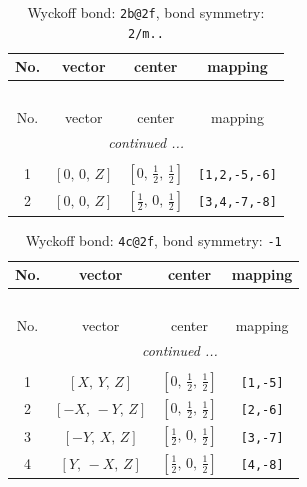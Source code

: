 \documentclass[fleqn,8pt]{jsarticle}
\begin{document}
\renewcommand{\arraystretch}{1.2}
\begin{longtable}{cccc}
\caption{Wyckoff bond: {\tt 2b@2f}, bond symmetry: {\tt 2/m..}}
 \\
 \hline \hline
No. & vector & center & mapping \\ \hline \endfirsthead

\multicolumn{3}{l}{\tablename\ \thetable{}} \\
 \hline \hline
No. & vector & center & mapping \\ \hline \endhead

 \hline \hline
\multicolumn{3}{r}{\footnotesize\it continued ...} \\ \endfoot

 \hline \hline
\multicolumn{3}{r}{} \\ \endlastfoot

1 & $\left[ 0,\, 0,\, Z \right]$ & $\left[ 0,\, \frac{1}{2},\, \frac{1}{2} \right]$ & {\tt [1,2,-5,-6]} \\ \hline
2 & $\left[ 0,\, 0,\, Z \right]$ & $\left[ \frac{1}{2},\, 0,\, \frac{1}{2} \right]$ & {\tt [3,4,-7,-8]} \\
\end{longtable}
\renewcommand{\arraystretch}{1.2}
\begin{longtable}{cccc}
\caption{Wyckoff bond: {\tt 4c@2f}, bond symmetry: {\tt -1}}
 \\
 \hline \hline
No. & vector & center & mapping \\ \hline \endfirsthead

\multicolumn{3}{l}{\tablename\ \thetable{}} \\
 \hline \hline
No. & vector & center & mapping \\ \hline \endhead

 \hline \hline
\multicolumn{3}{r}{\footnotesize\it continued ...} \\ \endfoot

 \hline \hline
\multicolumn{3}{r}{} \\ \endlastfoot

1 & $\left[ X,\, Y,\, Z \right]$ & $\left[ 0,\, \frac{1}{2},\, \frac{1}{2} \right]$ & {\tt [1,-5]} \\ \hline
2 & $\left[ - X,\, - Y,\, Z \right]$ & $\left[ 0,\, \frac{1}{2},\, \frac{1}{2} \right]$ & {\tt [2,-6]} \\ \hline
3 & $\left[ - Y,\, X,\, Z \right]$ & $\left[ \frac{1}{2},\, 0,\, \frac{1}{2} \right]$ & {\tt [3,-7]} \\ \hline
4 & $\left[ Y,\, - X,\, Z \right]$ & $\left[ \frac{1}{2},\, 0,\, \frac{1}{2} \right]$ & {\tt [4,-8]} \\
\end{longtable}
\end{document}
